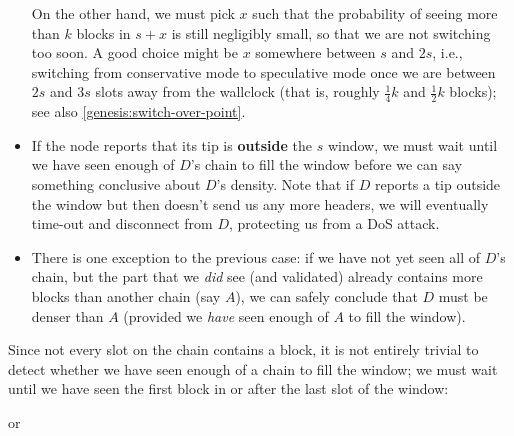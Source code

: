 \begin{itemize}
On the other hand, we must pick $x$ such that the probability of seeing more
than $k$ blocks in $s + x$ is still negligibly small, so that we are not
switching too soon. A good choice might be $x$ somewhere between $s$ and $2s$,
i.e., switching from conservative mode to speculative mode once we are between
$2s$ and $3s$ slots away from the wallclock (that is, roughly $\frac{1}{4}k$ and
$\frac{1}{2}k$ blocks); see also \cref{genesis:switch-over-point}.

\item If the node reports that its tip is \textbf{outside} the $s$ window, we
must wait until we have seen enough of $D$'s chain to fill the window before we
can say something conclusive about $D$'s density. Note that if $D$ reports a tip
outside the window but then doesn't send us any more headers, we will eventually
time-out and disconnect from $D$, protecting us from a DoS attack.
\item There is one exception to the previous case: if we have not yet seen all
of $D$'s chain, but the part that we \emph{did} see (and validated) already
contains more blocks than another chain (say $A$), we can safely conclude
that $D$ must be denser than $A$ (provided we \emph{have} seen enough of $A$
to fill the window).
\end{itemize}

Since not every slot on the chain contains a block, it is not entirely trivial
to detect whether we have seen enough of a chain to fill the window; we must
wait until we have seen the first block in or after the last slot of the window:
%
\begin{center}
%
\qquad or \qquad
%
\end{center}

